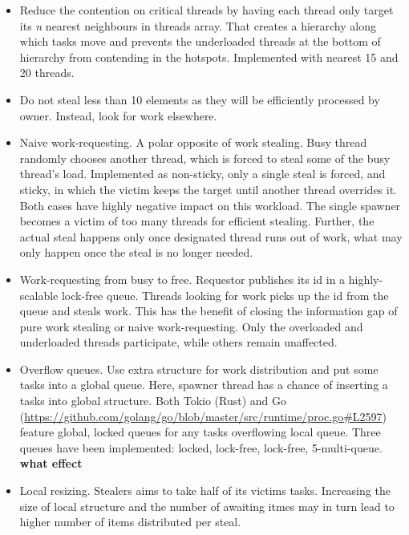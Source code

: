 \documentclass[12pt,a4paper,twoside]{report}
\begin{document}
\begin{itemize}
    \item Reduce the contention on critical threads by having each thread only target its \textit{n} nearest neighbours in threads array. That creates a hierarchy along which tasks move and prevents the underloaded threads at the bottom of hierarchy from contending in the hotspots. Implemented with nearest 15 and 20 threads.
    \item Do not steal less than 10 elements as they will be efficiently processed by owner. Instead, look for work elsewhere. 
    \item Naive work-requesting. A polar opposite of work stealing. Busy thread randomly chooses another thread, which is forced to steal some of the busy thread's load. Implemented as non-sticky, only a single steal is forced, and sticky, in which the victim keeps the target until another thread overrides it. Both cases have highly negative impact on this workload. The single spawner becomes a victim of too many threads for efficient stealing. Further, the actual steal happens only once designated thread runs out of work, what may only happen once the steal is no longer needed.
    \item Work-requesting from busy to free. Requestor publishes its id in a highly-scalable lock-free queue. Threads looking for work picks up the id from the queue and steals work. This has the benefit of closing the information gap of pure work stealing or naive work-requesting. Only the overloaded and underloaded threads participate, while others remain unaffected.
    \item Overflow queues. Use extra structure for work distribution and put some tasks into a global queue. Here, spawner thread has a chance of inserting a tasks into global structure. Both Tokio (Rust) and Go (\url{https://github.com/golang/go/blob/master/src/runtime/proc.go#L2597}) feature global, locked queues for any tasks overflowing local queue. Three queues have been implemented: locked, lock-free, lock-free, 5-multi-queue. \textbf{what effect}
    \item Local resizing. Stealers aims to take half of its victims tasks. Increasing the size of local structure and the number of awaiting itmes may in turn lead to higher number of items distributed per steal. 
\end{itemize}


\end{document}
